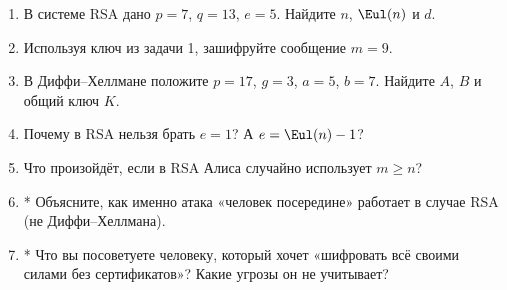 \begin{tasksbox}
\begin{enumerate}
  \item В системе RSA дано $p = 7$, $q = 13$, $e = 5$. Найдите $n$, $\Eul(n)$ и $d$.
  \item Используя ключ из задачи 1, зашифруйте сообщение $m = 9$.
  \item В Диффи--Хеллмане положите $p = 17$, $g = 3$, $a = 5$, $b = 7$. Найдите $A$, $B$ и общий ключ $K$.
  \item Почему в RSA нельзя брать $e = 1$? А $e = \Eul(n) - 1$?
  \item Что произойдёт, если в RSA Алиса случайно использует $m \ge n$?
  \item* Объясните, как именно атака «человек посередине» работает в случае RSA (не Диффи--Хеллмана).
  \item* Что вы посоветуете человеку, который хочет «шифровать всё своими силами без сертификатов»? Какие угрозы он не учитывает?
\end{enumerate}
\end{tasksbox}

